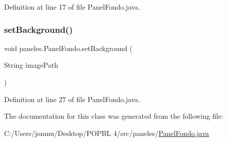 Definition at line 17 of file Panel\+Fondo.\+java.

\mbox{\label{classpaneles_1_1_panel_fondo_ae95bde361bef113903c6fa6b1b65acf2}} 
\subsubsection{\texorpdfstring{set\+Background()}{setBackground()}}
{\footnotesize\ttfamily void paneles.\+Panel\+Fondo.\+set\+Background (\begin{DoxyParamCaption}\item[{String}]{image\+Path }\end{DoxyParamCaption})}



Definition at line 27 of file Panel\+Fondo.\+java.



The documentation for this class was generated from the following file\+:\begin{DoxyCompactItemize}
\item 
C\+:/\+Users/jonmu/\+Desktop/\+P\+O\+P\+B\+L 4/src/paneles/\mbox{\hyperlink{_panel_fondo_8java}{Panel\+Fondo.\+java}}\end{DoxyCompactItemize}
